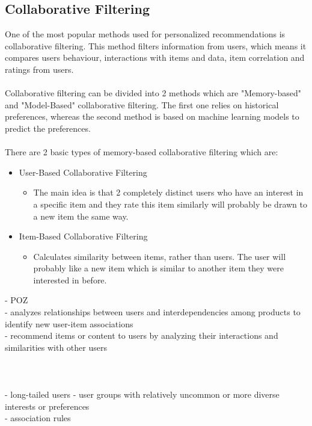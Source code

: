\documentclass[10pt,oneside,english,a4paper]{article}
\begin{document}
\clearpage
\subsection{Collaborative Filtering}
One of the most popular methods used for personalized recommendations is collaborative filtering. This method filters information from users, which means it compares users behaviour, interactions with items and data, item correlation and ratings from users. \\\\
Collaborative filtering can be divided into 2 methods which are "Memory-based" and "Model-Based" collaborative filtering. The first one relies on historical preferences, whereas the second method is based on machine learning models to predict the preferences.\\\\
There are 2 basic types of memory-based collaborative filtering which are:
\begin{itemize}
\item User-Based Collaborative Filtering
	\begin{itemize}
	\item The main idea is that 2 completely distinct users who have an interest in a specific item and they rate this item similarly will probably be drawn to a new item the same way.
	\end{itemize}
\item Item-Based Collaborative Filtering
	\begin{itemize}
	\item Calculates similarity between items, rather than users. The user will probably like a new item which is similar to another item they were interested in before.\\
	\end{itemize}
\end{itemize}
%
%
%
\clearpage{}
- POZ\\
- analyzes relationships between users  and interdependencies among products to identify new user-item associations\\
- recommend items or content to users by analyzing their interactions and similarities with other users\\\\
\cite{5197422}\\\\
%
- long-tailed users - user groups with relatively uncommon or more diverse interests or preferences\\
- association rules\\
\cite{Yan2024}\\\\
\end{document}
